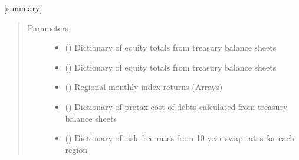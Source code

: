 \documentclass[a4paper,12pt,english]{article}
\begin{document}
\begin{fulllineitems}
\begin{fulllineitems}
\begin{quote}
\begin{description}
\begin{itemize}
\end{itemize}

\end{description}\end{quote}

\end{fulllineitems}


\begin{fulllineitems}
\label{\detokenize{GOCPI:GOCPI.CreateCases.CreateCases.set_discount_rate}}
{[}summary{]}
\begin{quote}\begin{description}
\item[{Parameters}] \leavevmode\begin{itemize}
\item {} 
 () \textendash{} Dictionary of equity totals from treasury balance sheets

\item {} 
 () \textendash{} Dictionary of equity totals from treasury balance sheets

\item {} 
 (\sphinxstyleliteralemphasis{\sphinxupquote{, }}) \textendash{} Regional monthly index returns (Arrays)

\item {} 
 () \textendash{} Dictionary of pre\sphinxhyphen{}tax cost of debts calculated from treasury balance sheets

\item {} 
 () \textendash{} Dictionary of risk free rates from 10 year swap rates for each region


\end{itemize}
\end{description}
\end{quote}
\end{fulllineitems}
\end{fulllineitems}
\end{document}
